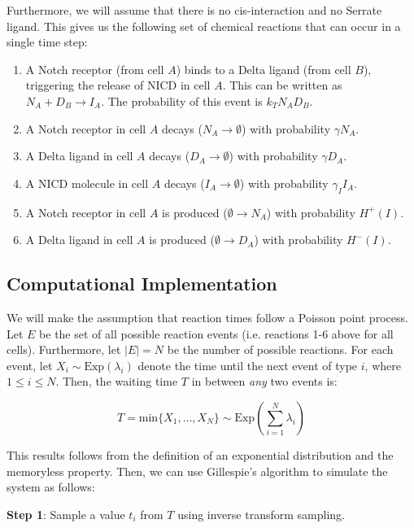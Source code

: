 \documentclass{article}
\begin{document}
\begin{flushleft}
\newpage

Furthermore, we will assume that there is no cis-interaction and no Serrate ligand. This gives us the following set of chemical reactions that can occur in a single time step:

\begin{enumerate}
  \item A Notch receptor (from cell $A$) binds to a Delta ligand (from cell $B$), triggering the release of NICD in cell $A$. This can be written as $N_{A} + D_{B} \rightarrow I_{A}$. The probability of this event is $k_{T}N_{A}D_{B}$.
  \item A Notch receptor in cell $A$ decays ($N_{A} \rightarrow \emptyset$) with probability $\gamma N_{A}$.
  \item A Delta ligand in cell $A$ decays ($D_{A} \rightarrow \emptyset$) with probability $\gamma D_{A}$.
  \item A NICD molecule in cell $A$ decays ($I_{A} \rightarrow \emptyset$) with probability $\gamma_{I}I_{A}$.
  \item A Notch receptor in cell $A$ is produced ($\emptyset \rightarrow N_{A}$) with probability $H^{+}(I)$.
  \item A Delta ligand in cell $A$ is produced ($\emptyset \rightarrow D_{A}$) with probability $H^{-}(I)$.
\end{enumerate}

\subsection{Computational Implementation}

We will make the assumption that reaction times follow a Poisson point process. Let $E$ be the set of all possible reaction events (i.e. reactions 1-6 above for all cells). Furthermore, let $|E| = N$ be the number of possible reactions. For each event, let $X_{i} \sim \text{Exp}(\lambda_{i})$ denote the time until the next event of type $i$, where $1 \leq i \leq N$. Then, the waiting time $T$ in between \emph{any} two events is:

$$
T = \text{min} \{ X_{1}, \dots, X_{N} \} \sim \text{Exp}\left( \sum_{i = 1}^{N} \lambda_{i} \right) 
$$

This results follows from the definition of an exponential distribution and the memoryless property. Then, we can use Gillespie's algorithm to simulate the system as follows:

\medskip

\textbf{Step 1}: Sample a value $t_{i}$ from $T$ using inverse transform sampling. 


\end{flushleft}
\end{document}
